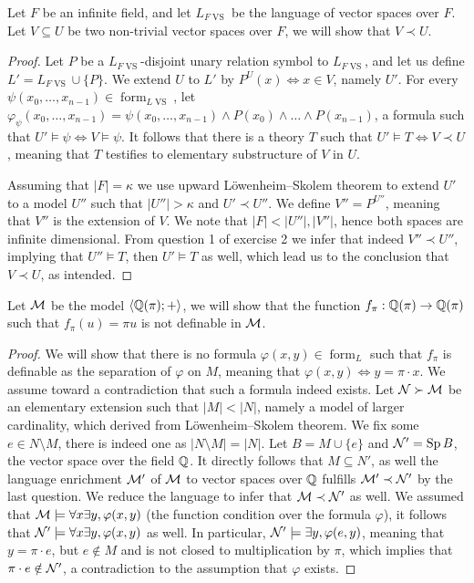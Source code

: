 \question{}
Let $F$ be an infinite field, and let $L_{F \operatorname{VS}}$ be the language of vector spaces over $F$.
Let $V \subseteq U$ be two non-trivial vector spaces over $F$, we will show that $V \prec U$.
\begin{proof}
	Let $P$ be a $L_{F \operatorname{VS}}$-disjoint unary relation symbol to $L_{F \operatorname{VS}}$, and let us define $L' = L_{F \operatorname{VS}} \cup \{ P \}$.
	We extend $U$ to $L'$ by $P^U(x) \iff x \in V$, namely $U'$.
	For every $\psi(x_0, \ldots, x_{n - 1}) \in \operatorname{form}_{L \operatorname{VS}}$, let $\varphi_{\psi}(x_0, \ldots, x_{n - 1}) = \psi(x_0, \ldots, x_{n - 1}) \land P(x_0) \land \ldots \land P(x_{n - 1})$,
	a formula such that $U' \models \psi \iff V \models \psi$.
	It follows that there is a theory $T$ such that $U' \models T \iff V \prec U$, meaning that $T$ testifies to elementary substructure of $V$ in $U$.

	Assuming that $|F| = \kappa$ we use upward Löwenheim–Skolem theorem to extend $U'$ to a model $U''$ such that $|U''| > \kappa$ and $U' \prec U''$.
	We define $V'' = P^{U''}$, meaning that $V''$ is the extension of $V$.
	We note that $|F| < |U''|, |V''|$, hence both spaces are infinite dimensional.
	From question 1 of exercise 2 we infer that indeed $V'' \prec U''$, implying that $U'' \models T$, then $U' \models T$ as well, which lead us to the conclusion that $V \prec U$, as intended.
\end{proof}

\question{}
Let $\mathcal{M}$ be the model $\langle \mathbb{Q}(\pi); + \rangle$,
we will show that the function $f_\pi : \mathbb{Q}(\pi) \to \mathbb{Q}(\pi)$ such that $f_\pi(u) = \pi u$ is not definable in $\mathcal{M}$.
\begin{proof}
	We will show that there is no formula $\varphi(x, y) \in \operatorname{form}_L$ such that $f_\pi$ is definable as the separation of $\varphi$ on $M$, meaning that $\varphi(x, y) \iff y = \pi \cdot x$.
	We assume toward a contradiction that such a formula indeed exists.
	Let $\mathcal{N} \succ \mathcal{M}$ be an elementary extension such that $|M| < |N|$, namely a model of larger cardinality, which derived from Löwenheim–Skolem theorem.
	We fix some $e \in N \setminus M$, there is indeed one as $|N \setminus M| = |N|$.
	Let $B = M \cup \{ e \}$ and $\mathcal{N}' = \operatorname{Sp} B$, the vector space over the field $\mathbb{Q}$.
	It directly follows that $M \subseteq N'$, as well the language enrichment $\mathcal{M}'$ of $\mathcal{M}$ to vector spaces over $\mathbb{Q}$ fulfills $\mathcal{M}' \prec \mathcal{N}'$ by the last question.
	We reduce the language to infer that $\mathcal{M} \prec \mathcal{N}'$ as well.
	We assumed that $\mathcal{M} \models \forall x \exists y, \varphi(x, y)$ (the function condition over the formula $\varphi$), it follows that $\mathcal{N}' \models \forall x \exists y, \varphi(x, y)$ as well.
	In particular, $\mathcal{N}' \models \exists y, \varphi(e, y)$, meaning that $y = \pi \cdot e$, but $e \notin M$ and is not closed to multiplication by $\pi$, which implies that $\pi \cdot e \notin \mathcal{N}'$,
	a contradiction to the assumption that $\varphi$ exists.
\end{proof}

